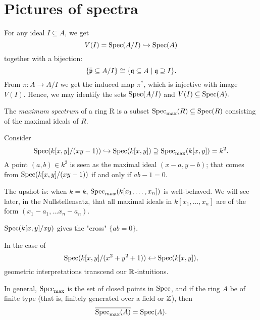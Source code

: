 \section{Pictures of spectra}

For any ideal $I \subseteq A$, we get
\[ V(I) = \text{Spec}(A/{I}) \hookrightarrow \text{Spec}(A)\]
together with a bijection:
\[\{ \bar{\mathfrak p} \subseteq A / I\} \cong \{ \mathfrak q \subseteq A \mathrel{|} \mathfrak q \supseteq I\}.\]
From
\(\pi: A \to A/{I}\)
we get the induced map $\pi^*$, which is injective with image $V(I)$. Hence, we may identify the sets \( \text{Spec}(A/{I})\) and \(V(I) \subseteq \text{Spec}(A).\)

\begin{df}
  The \emph{maximum spectrum} of a ring R is a subset \(\text{Spec}_{\mathrm{max}}(R) \subseteq \text{Spec}(R)\) consisting of the maximal ideals of \(R.\)
\end{df}

\begin{example}
  Consider
  \[ \text{Spec}(k[x,y]/(xy-1)) \hookrightarrow \text{Spec}(k[x,y]) \supseteq \text{Spec}_{\mathrm{max}}(k[x,y]) = k^2.\]
A point $(a, b) \in k^2$ is seen as the maximal ideal $(x-a,y-b)$; that comes from $\text{Spec}(k[x,y]/{(xy-1)})$ if and only if $ab-1 = 0$.
\end{example}

The upshot is: when $k = \bar k$, $\text{Spec}_{max}(k[x_1, \ldots, x_n])$ is well-behaved. We will see later, in the Nullstellensatz, that all maximal ideals in $k[x_1, \ldots, x_n]$ are of the form $(x_1 - a_1, \ldots x_n - a_n)$.

\begin{example}
  $\text{Spec} (k[x,y]/{xy})$ gives the "cross" $\{ ab=0 \}$.
\end{example}

\begin{example}
  In the case of
  \[\text{Spec}(k[x,y]/(x^2 + y^2 + 1)) \hookleftarrow \text{Spec}(k[x,y]),\]
  geometric interpretations transcend our $\mathbb R$-intuitions.
\end{example}

\begin{note}
  In general, $\text{Spec}_{\text{max}}$ is the set of closed points in $\text{Spec}$, and if the ring $A$ be of finite type (that is, finitely generated over a field or $\mathbb Z$), then
  \[ \overline{\text{Spec}_{\text{max}}(A)} = \text{Spec}(A).\]
\end{note}

